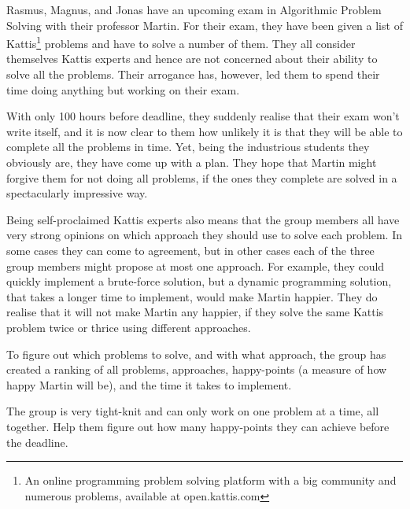 Rasmus, Magnus, and Jonas have an upcoming exam in Algorithmic Problem Solving with their professor Martin. For their exam, they have been given a list of Kattis\footnote{An online programming problem solving platform with a big community and numerous problems, available at open.kattis.com} problems and have to solve a number of them. They all consider themselves Kattis experts and hence are not concerned about their ability to solve all the problems. Their arrogance has, however, led them to spend their time doing anything but working on their exam.

With only 100 hours before deadline, they suddenly realise that their exam won't write itself, and it is now clear to them how unlikely it is that they will be able to complete all the problems in time. Yet, being the industrious students they obviously are, they have come up with a plan. They hope that Martin might forgive them for not doing all problems, if the ones they complete are solved in a spectacularly impressive way.

Being self-proclaimed Kattis experts also means that the group members all have very strong opinions on which approach they should use to solve each problem. In some cases they can come to agreement, but in other cases each of the three group members might propose at most one approach. For example, they could quickly implement a brute-force solution, but a dynamic programming solution, that takes a longer time to implement, would make Martin happier. They do realise that it will not make Martin any happier, if they solve the same Kattis problem twice or thrice using different approaches. 

To figure out which problems to solve, and with what approach, the group has created a ranking of all problems, approaches, happy-points (a measure of how happy Martin will be), and the time it takes to implement.

The group is very tight-knit and can only work on one problem at a time, all together. Help them figure out how many happy-points they can achieve before the deadline.

